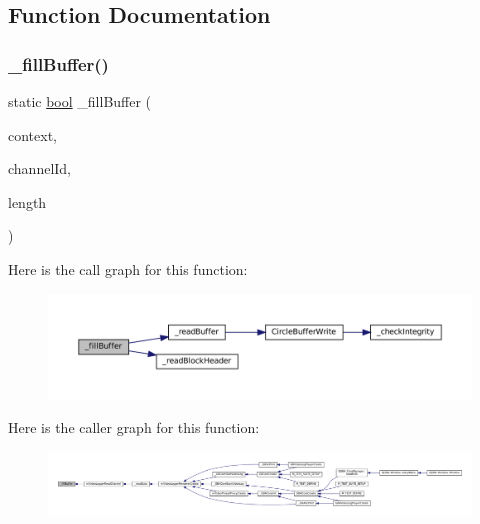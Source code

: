 \subsection{Function Documentation}
\mbox{\label{video-logger_8c_ac918b379da982809457516728ac365c0}} 
\subsubsection{\texorpdfstring{\+\_\+fill\+Buffer()}{\_fillBuffer()}}
{\footnotesize\ttfamily static \mbox{\hyperlink{libretro_8h_a4a26dcae73fb7e1528214a068aca317e}{bool}} \+\_\+fill\+Buffer (\begin{DoxyParamCaption}\item[{struct m\+Video\+Log\+Context $\ast$}]{context,  }\item[{size\+\_\+t}]{channel\+Id,  }\item[{size\+\_\+t}]{length }\end{DoxyParamCaption})\hspace{0.3cm}{\ttfamily [static]}}

Here is the call graph for this function\+:
\nopagebreak
\begin{figure}[H]
\begin{center}
\leavevmode
\includegraphics[width=350pt]{video-logger_8c_ac918b379da982809457516728ac365c0_cgraph}
\end{center}
\end{figure}
Here is the caller graph for this function\+:
\nopagebreak
\begin{figure}[H]
\begin{center}
\leavevmode
\includegraphics[width=350pt]{video-logger_8c_ac918b379da982809457516728ac365c0_icgraph}
\end{center}
\end{figure}
\mbox{\label{video-logger_8c_a7a65448771b3eb66410f5d1e4537e322}} 

